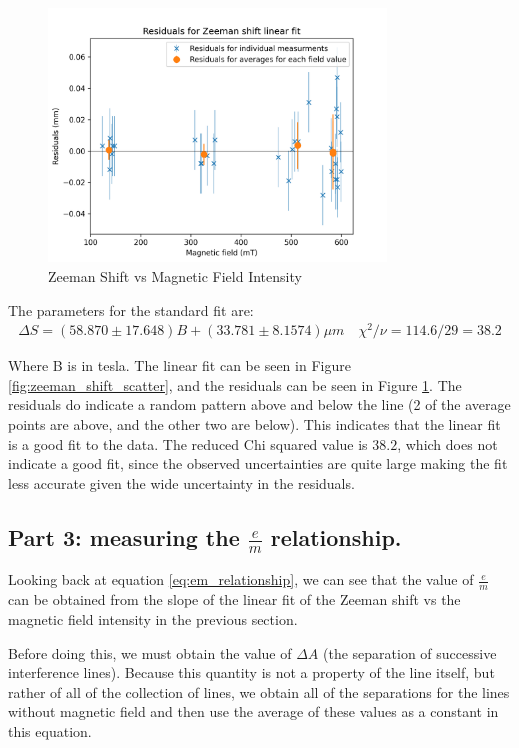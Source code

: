 \begin{figure}
    \centering
    \includegraphics[width=0.8\textwidth]{Results/img/zeeman_shift_residuals.png}
    \caption{Zeeman Shift vs Magnetic Field Intensity}
    \label{fig:zeeman_shift_residuals}
\end{figure}

The parameters for the standard fit are:
\begin{gather*}
    \Delta S = (58.870 \pm 17.648)B + (33.781 \pm 8.1574) \mu m \quad \chi^2 / \nu = 114.6 / 29 = 38.2
\end{gather*}

Where B is in tesla. The linear fit can be seen in Figure \ref{fig:zeeman_shift_scatter}, and the residuals can be seen in Figure \ref{fig:zeeman_shift_residuals}. The residuals do indicate a random
pattern above and below the line (2 of the average points are above, and the other two are below). This indicates that the linear fit is a good fit to the data.
The reduced Chi squared value is $38.2$, which does not indicate a good fit, since the observed uncertainties are quite large making the fit less accurate given the wide uncertainty in the residuals.
\subsection{Part 3: measuring the $\frac{e}{m}$ relationship.}

Looking back at equation \ref{eq:em_relationship}, we can see that the value of $\frac{e}{m}$ can be obtained from the slope of the linear fit of the Zeeman shift vs the magnetic field intensity in the previous section.

Before doing this, we must obtain the value of $\Delta A$ (the separation of successive interference lines). Because this quantity is not a property
of the line itself, but rather of all of the collection of lines, we obtain all of the separations for the lines without magnetic field
and then use the average of these values as a constant in this equation.

